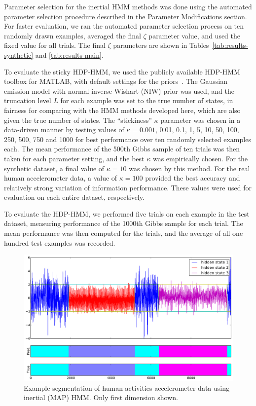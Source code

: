 \documentclass[letterpaper]{article}
\begin{document}
Parameter selection for the inertial HMM methods was done using the automated
parameter selection procedure described in the Parameter Modifications section. For faster evaluation, we ran 
the automated parameter selection process on ten randomly drawn examples, averaged 
the final $\zeta$ parameter value, and used the fixed value for all trials. The 
final $\zeta$ parameters are shown in Tables~\ref{tab:results-synthetic} and \ref{tab:results-main}.

To evaluate the sticky HDP-HMM, we used the publicly available HDP-HMM toolbox for MATLAB,
with default settings for the priors~\cite{HDP-HMM-TOOLKIT}. The Gaussian emission model with normal
inverse Wishart (NIW) prior was used, and the truncation level $L$ for each
example was set to the true number of states, in fairness for comparing with the
HMM methods developed here, which are also given the true number of states. The
``stickiness'' $\kappa$ parameter was chosen in a data-driven manner by testing
values of $\kappa=0.001$, 0.01, 0.1, 1, 5, 10, 50, 100, 250, 500, 750 and 1000 
for best performance over ten randomly selected examples each.
The mean performance of the 500th Gibbs sample of ten trials was then taken for
each parameter setting, and the best $\kappa$ was empirically chosen. For the
synthetic dataset, a final value of $\kappa=10$ was chosen by this method. For
the real human accelerometer data, a value of $\kappa=100$ provided the best
accuracy and relatively strong variation of information performance. These
values were used for evaluation on each entire dataset, respectively.

To evaluate the HDP-HMM, we performed five trials on each example in the test
dataset, measuring performance of the 1000th Gibbs sample for each trial. The
mean performance was then computed for the trials, and the average of all one
hundred test examples was recorded.

\begin{figure}[htbp]
\setlength{\abovecaptionskip}{0pt}
\setlength{\belowcaptionskip}{0cm}
  \centering
    \includegraphics[width=1.0\linewidth]{images/real_segmentation_result.pdf}    
    \caption{\small{Example segmentation of human activities accelerometer data using inertial (MAP) HMM. Only first dimension shown.}}
    \label{fig:real-results-MAP}
\end{figure}
\end{document}
